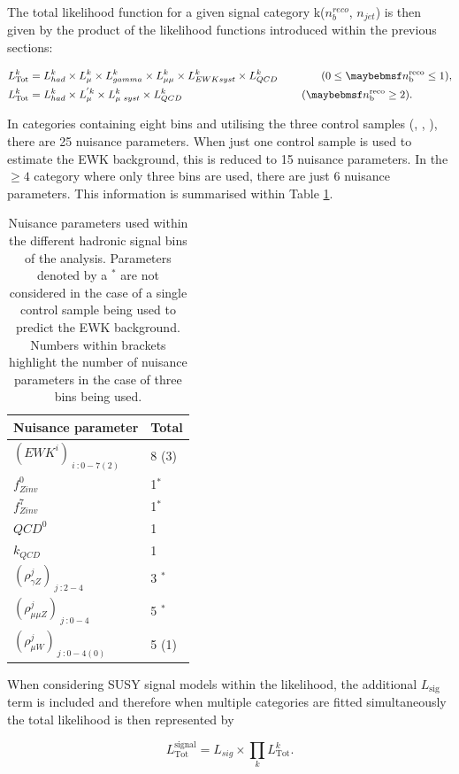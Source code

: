 The total likelihood function for a given signal category k($n_{b}^{reco}$, $n_{jet}$) is then given by the product of the likelihood functions introduced within the previous sections:

\begin{align}
L^{k}_{\text{Tot}} &= L^{k}_{had} \times  L^{k}_{\mu} \times  L^{k}_{\gamma} \times  L^{k}_{\mu\mu} \times  L^{k}_{EWK syst} \times  L^{k}_{QCD}  \qquad\qquad (0 \leq \nbreco \leq 1), \nonumber \\
L^{k}_{\text{Tot}} &= L^{k}_{had} \times  L^{'\xspace k }_{\mu} \times  L^{k}_{\mu\text{ }syst} \times  L^{k}_{QCD} \quad\qquad\qquad\qquad\qquad\qquad(\nbreco \geq 2).
\label{eq:totallikelihoodfunc}
\end{align}

In categories containing eight \theht bins and utilising the three control samples (\mupjets, \dimupjets, \gpjets), there are 25 nuisance parameters. When just one control sample is used to estimate the \ac{EWK} background, this is reduced to 15 nuisance parameters. In the \nbreco$\geq4$ category where only three \theht bins are used, there are just 6 nuisance parameters. This information is summarised within Table \ref{tab:nuisanceparameters}.

 \begin{table}[h!]
 \footnotesize
\begin{center}
\begin{tabular*}{0.45\textwidth}{@{\extracolsep{\fill}}ll}
\hline
Nuisance parameter & Total \\
\hline\hline
$(EWK^{i})_{\ i\ : 0-7(2)}$ & 8 (3) \\
$f^{0}_{Zinv}$  & 1$^{*}$ \\
 $f^{7}_{Zinv}$  &1$^{*}$ \\
 $QCD^{0}$ & 1 \\
 $k_{QCD}$ & 1 \\
 $(\rho^{j}_{\gamma Z})_{\ j \ : 2-4}$  & 3 $^{*}$\\
 $(\rho^{j}_{\mu\mu Z})_{\ j \ : 0-4}$   & 5 $^{*}$ \\
 $(\rho^{j}_{\mu W})_{\ j \ : 0-4(0)}$ & 5 (1) \\
\end{tabular*}
\end{center}
\caption[Nuisance parameters used within the different hadronic signal bins of the analysis]{Nuisance parameters used within the different hadronic signal bins of the analysis. Parameters denoted by a $^{*}$ are not considered in the case of a single control sample being used to predict the \ac{EWK} background. Numbers within brackets highlight the number of nuisance parameters in the case of three \theht bins being used.}\label{tab:nuisanceparameters}
\end{table}

When considering \ac{SUSY} signal models within the likelihood, the additional $L_{\text{sig}}$ term is included and therefore when multiple categories are fitted simultaneously the total likelihood is then represented by 

\begin{equation}
L^{\text{signal}}_{\text{Tot}} =  L_{sig} \times \prod_{k} L^{k}_{\text{Tot}}.
\end{equation}
